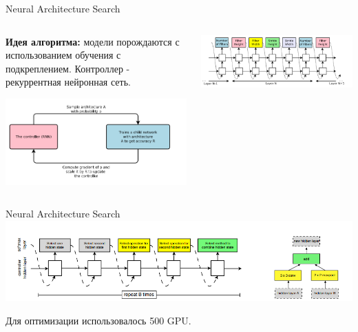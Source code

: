 \documentclass[10pt,pdf,utf8,russian,aspectratio=169]{beamer}
\begin{document}
\begin{frame}{Neural Architecture Search}
\begin{columns}[T] 
\begin{column}{.48\textwidth}
\textbf{Идея алгоритма:} модели порождаются с использованием обучения с подкреплением. Контроллер - рекуррентная нейронная сеть.

\includegraphics[width=\textwidth]{nas_scheme.png}
\end{column}
\begin{column}{.48\textwidth}
\includegraphics[width=\textwidth]{nas_seq.png}
\end{column}
\end{columns}
\end{frame}


\begin{frame}{Neural Architecture Search}
\includegraphics[width=\textwidth]{nas_transfer.png}

Для оптимизации использовалось 500 GPU.
\end{frame}
\end{document}
